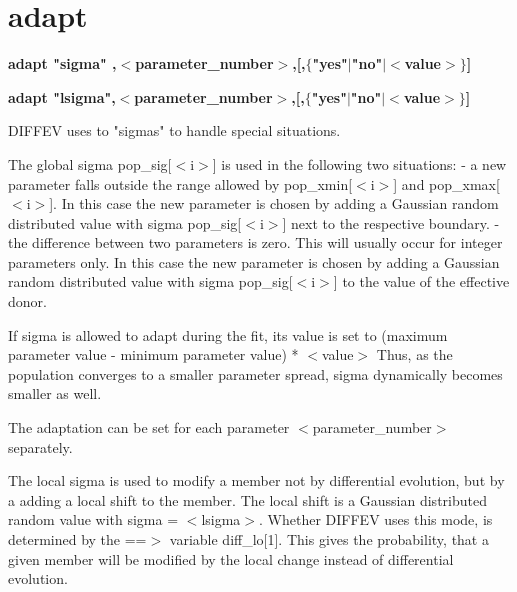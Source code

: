 \section{adapt}
{\bf adapt "sigma" ,$ <$parameter\_number$> $,[,$ \{$"yes"$| $"no"$| $$ <$value$> $$\} $] \par }
{\bf adapt "lsigma",$ <$parameter\_number$> $,[,$ \{$"yes"$| $"no"$| $$ <$value$> $$\} $] \par }
\par
\vspace{3pt}
DIFFEV uses to "sigmas" to handle special situations. 
\par
The global sigma pop\_sig[$ <$i$> $] is used in the following two situations: 
- a new parameter falls outside the range allowed by pop\_xmin[$ <$i$> $] and 
  pop\_xmax[$ <$i$> $]. In this case the new parameter is chosen by adding a 
  Gaussian random distributed value with sigma pop\_sig[$ <$i$> $] next to the 
  respective boundary. 
- the difference between two parameters is zero. This will usually 
  occur for integer parameters only. In this case the new parameter is 
  chosen by adding a Gaussian random distributed value with sigma 
  pop\_sig[$ <$i$> $] to the value of the effective donor. 
\par
If sigma is allowed to adapt during the fit, its value is set to 
(maximum parameter value - minimum parameter value) * $ <$value$> $ 
Thus, as the population converges to a smaller parameter spread, sigma 
dynamically becomes smaller as well. 
\par
The adaptation can be set for each parameter $ <$parameter\_number$> $ 
separately. 
\par
The local sigma is used to modify a member not by differential evolution, 
but by a adding a local shift to the member. The local shift is a 
Gaussian distributed random value with sigma = $ <$lsigma$> $. 
Whether DIFFEV uses this mode, is determined  by the ==$> $ variable 
diff\_lo[1]. This gives the probability, that a given member will be 
modified by the local change instead of differential evolution. 
